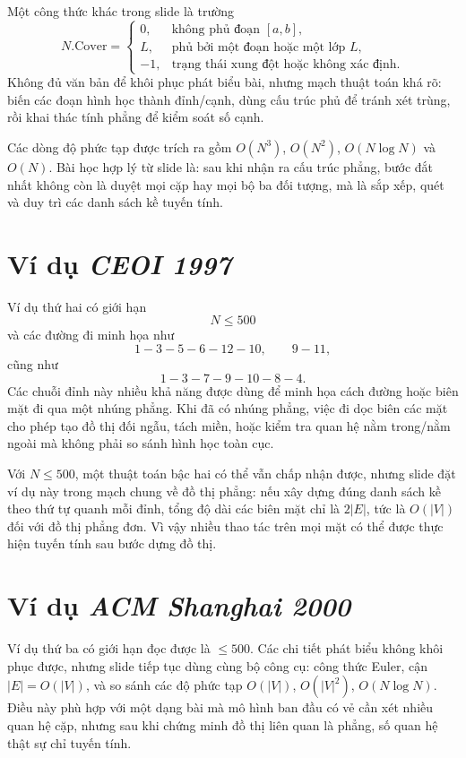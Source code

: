 \documentclass[11pt]{article}
\begin{document}
Một công thức khác trong slide là trường
\[
N.\mathrm{Cover}=
\begin{cases}
0, & \text{không phủ đoạn }[a,b],\\
L, & \text{phủ bởi một đoạn hoặc một lớp }L,\\
-1, & \text{trạng thái xung đột hoặc không xác định.}
\end{cases}
\]
Không đủ văn bản để khôi phục phát biểu bài, nhưng mạch thuật toán khá rõ:
biến các đoạn hình học thành đỉnh/cạnh, dùng cấu trúc phủ để tránh xét trùng,
rồi khai thác tính phẳng để kiểm soát số cạnh.

Các dòng độ phức tạp được trích ra gồm \(O(N^3)\), \(O(N^2)\), \(O(N\log N)\)
và \(O(N)\). Bài học hợp lý từ slide là: sau khi nhận ra cấu trúc phẳng,
bước đắt nhất không còn là duyệt mọi cặp hay mọi bộ ba đối tượng, mà là sắp
xếp, quét và duy trì các danh sách kề tuyến tính.

\section{Ví dụ \textit{CEOI 1997}}

Ví dụ thứ hai có giới hạn
\[
  N\le 500
\]
và các đường đi minh họa như
\[
  1-3-5-6-12-10,\qquad 9-11,
\]
cũng như
\[
  1-3-7-9-10-8-4.
\]
Các chuỗi đỉnh này nhiều khả năng được dùng để minh họa cách đường hoặc biên
mặt đi qua một nhúng phẳng. Khi đã có nhúng phẳng, việc đi dọc biên các mặt
cho phép tạo đồ thị đối ngẫu, tách miền, hoặc kiểm tra quan hệ nằm trong/nằm
ngoài mà không phải so sánh hình học toàn cục.

Với \(N\le500\), một thuật toán bậc hai có thể vẫn chấp nhận được, nhưng slide
đặt ví dụ này trong mạch chung về đồ thị phẳng: nếu xây dựng đúng danh sách
kề theo thứ tự quanh mỗi đỉnh, tổng độ dài các biên mặt chỉ là \(2|E|\), tức
là \(O(|V|)\) đối với đồ thị phẳng đơn. Vì vậy nhiều thao tác trên mọi mặt có
thể được thực hiện tuyến tính sau bước dựng đồ thị.

\section{Ví dụ \textit{ACM Shanghai 2000}}

Ví dụ thứ ba có giới hạn đọc được là \(\le500\). Các chi tiết phát biểu không
khôi phục được, nhưng slide tiếp tục dùng cùng bộ công cụ: công thức Euler,
cận \(|E|=O(|V|)\), và so sánh các độ phức tạp \(O(|V|)\),
\(O(|V|^2)\), \(O(N\log N)\). Điều này phù hợp với một dạng bài mà mô hình
ban đầu có vẻ cần xét nhiều quan hệ cặp, nhưng sau khi chứng minh đồ thị liên
quan là phẳng, số quan hệ thật sự chỉ tuyến tính.
\end{document}
